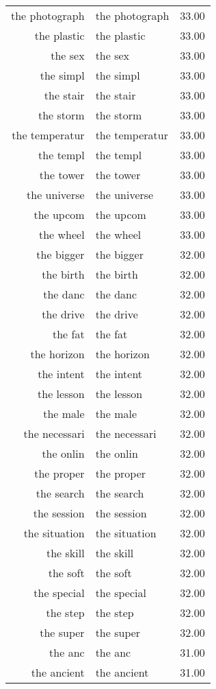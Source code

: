 \begin{table}[ht]
\begin{tabular}{rlr}
  the photograph & the photograph & 33.00 \\ 
  the plastic & the plastic & 33.00 \\ 
  the sex & the sex & 33.00 \\ 
  the simpl & the simpl & 33.00 \\ 
  the stair & the stair & 33.00 \\ 
  the storm & the storm & 33.00 \\ 
  the temperatur & the temperatur & 33.00 \\ 
  the templ & the templ & 33.00 \\ 
  the tower & the tower & 33.00 \\ 
  the universe & the universe & 33.00 \\ 
  the upcom & the upcom & 33.00 \\ 
  the wheel & the wheel & 33.00 \\ 
  the bigger & the bigger & 32.00 \\ 
  the birth & the birth & 32.00 \\ 
  the danc & the danc & 32.00 \\ 
  the drive & the drive & 32.00 \\ 
  the fat & the fat & 32.00 \\ 
  the horizon & the horizon & 32.00 \\ 
  the intent & the intent & 32.00 \\ 
  the lesson & the lesson & 32.00 \\ 
  the male & the male & 32.00 \\ 
  the necessari & the necessari & 32.00 \\ 
  the onlin & the onlin & 32.00 \\ 
  the proper & the proper & 32.00 \\ 
  the search & the search & 32.00 \\ 
  the session & the session & 32.00 \\ 
  the situation & the situation & 32.00 \\ 
  the skill & the skill & 32.00 \\ 
  the soft & the soft & 32.00 \\ 
  the special & the special & 32.00 \\ 
  the step & the step & 32.00 \\ 
  the super & the super & 32.00 \\ 
  the anc & the anc & 31.00 \\ 
  the ancient & the ancient & 31.00 \\ 

\end{tabular}
\end{table}

